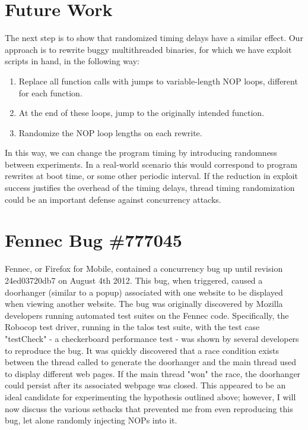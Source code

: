 \documentclass[letterpaper,twocolumn,10pt]{article}
\begin{document}
\section{Future Work}
The next step is to show that randomized timing delays have a similar effect.  Our approach is to rewrite buggy multithreaded binaries, for which we have exploit scripts in hand, in the following way:
\begin{enumerate}
	\item Replace all function calls with jumps to variable-length NOP loops, different for each function.
	\item At the end of these loops, jump to the originally intended function.
	\item Randomize the NOP loop lengths on each rewrite.
\end{enumerate}
In this way, we can change the program timing by introducing randomness between experiments.  In a real-world scenario this would correspond to program rewrites at boot time, or some other periodic interval.  If the reduction in exploit success justifies the overhead of the timing delays, thread timing randomization could be an important defense against concurrency attacks.

\section{Fennec Bug \#777045}
Fennec, or Firefox for Mobile, contained a concurrency bug up until revision 24ed03720db7 on August 4th 2012.  This bug, when triggered, caused a doorhanger (similar to a popup) associated with one website to be displayed when viewing another website.  The bug was originally discovered by Mozilla developers running automated test suites on the Fennec code.  Specifically, the Robocop test driver, running in the talos test suite, with the test case "testCheck" - a checkerboard performance test - was shown by several developers to reproduce the bug.  It was quickly discovered that a race condition exists between the thread called to generate the doorhanger and the main thread used to display different web pages.  If the main thread "won" the race, the doorhanger could persist after its associated webpage was closed.  This appeared to be an ideal candidate for experimenting the hypothesis outlined above; however, I will now discuss the various setbacks that prevented me from even reproducing this bug, let alone randomly injecting NOPs into it.
\end{document}
